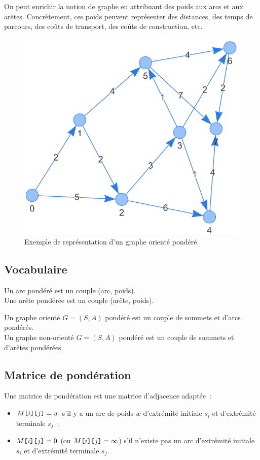 On peut enrichir la notion de graphe en attribuant des poids aux arcs et aux arêtes. Concrètement, ces poids peuvent représenter des distances, des temps de parcours, des coûts de transport, des coûts de construction, etc.

\begin{figure}[hb]
	\begin{center}
		\includegraphics[width=0.35\linewidth]{images/oriente_pondere}
		\caption{Exemple de représentation d'un graphe orienté pondéré}
		\label{pondere}
	\end{center}
\end{figure}

\subsection{Vocabulaire}


\begin{defi}
Un arc pondéré est un couple (arc, poids).\\
Une arête pondérée est un couple (arête, poids).
\end{defi}

\begin{defi}
Un graphe orienté $G = (S,A)$ pondéré est un couple de sommets et d'arcs pondérés.\\
Un graphe non-orienté $G = (S,A)$ pondéré est un couple de sommets et d'arêtes pondérées.
\end{defi}

\subsection{Matrice de pondération}

Une matrice de pondération est une matrice d'adjacence adaptée~: 
\begin{itemize}
	\item $M\verb![!i\verb!]!\verb![!j\verb!]!= w$ s'il y a un arc de poids $w$ d'extrémité initiale $s_i$ et d'extrémité terminale $s_j$~; 
	\item $M\verb![!i\verb!]!\verb![!j\verb!]!=0$ (ou $M\verb![!i\verb!]!\verb![!j\verb!]!=\infty$) s'il n'existe pas un arc d'extrémité initiale $s_i$ et d'extrémité terminale $s_j$.
\end{itemize}


